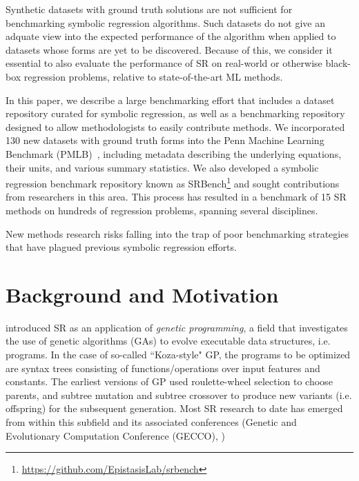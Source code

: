 Synthetic datasets with ground truth solutions are not sufficient for benchmarking symbolic regression algorithms. 
Such datasets do not give an adquate view into the expected performance of the algorithm when applied to datasets whose forms are yet to be discovered. 
Because of this, we consider it essential to also evaluate the performance of SR on real-world or otherwise black-box regression problems, relative to state-of-the-art ML methods. 

In this paper, we describe a large benchmarking effort that includes a dataset repository curated for symbolic regression, as well as a benchmarking repository designed to allow methodologists to easily contribute methods. 
We incorporated 130 new datasets with ground truth forms into the Penn Machine Learning Benchmark (PMLB)~\cite{olsonPMLBLargeBenchmark2017d}, including metadata describing the underlying equations, their units, and various summary statistics. 
We also developed a symbolic regression benchmark repository known as SRBench\footnote{\url{https://github.com/EpistasisLab/srbench}} and sought contributions from researchers in this area. 
This process has resulted in a benchmark of 15 SR methods on hundreds of regression problems, spanning several disciplines. 

New methods research risks falling into the trap of poor benchmarking strategies that have plagued previous symbolic regression efforts. 

\section{Background and Motivation}

\citet{kozaGeneticProgrammingProgramming1992a} introduced SR as an application of \textit{genetic programming}, a field that investigates the use of genetic algorithms (GAs) to evolve executable data structures, i.e. programs. 
In the case of so-called ``Koza-style" GP, the programs to be optimized are syntax trees consisting of functions/operations over input features and constants. 
The earliest versions of GP used roulette-wheel selection to choose parents, and subtree mutation and subtree crossover to produce new variants (i.e. offspring) for the subsequent generation. 
Most SR research to date has emerged from within this subfield and its associated conferences (Genetic and Evolutionary Computation Conference (GECCO), )

